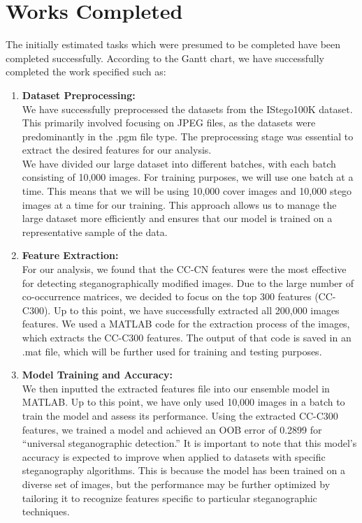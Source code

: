 \chapter{Works Completed}\sloppy

The initially estimated tasks which were presumed to be completed have been completed successfully. According to the Gantt chart, we have successfully completed the work specified such as:

\begin{enumerate}[label=\arabic*.]
    \item \textbf{Dataset Preprocessing:} \\
   We have successfully preprocessed the datasets from the IStego100K dataset\cite{7}. This primarily involved focusing on JPEG files, as the datasets were predominantly in the .pgm file type. The preprocessing stage was essential to extract the desired features for our analysis.\\
   We have divided our large dataset into different batches, with each batch consisting of 10,000 images. For training purposes, we will use one batch at a time. This means that we will be using 10,000 cover images and 10,000 stego images at a time for our training. This approach allows us to manage the large dataset more efficiently and ensures that our model is trained on a representative sample of the data.
    
    \item \textbf{Feature Extraction:} \\
    For our analysis, we found that the CC-CN features were the most effective for detecting steganographically modified images. Due to the large number of co-occurrence matrices, we decided to focus on the top 300 features (CC-C300). Up to this point, we have successfully extracted all 200,000 images features. We used a MATLAB code for the extraction process of the images, which extracts the CC-C300 features. The output of that code is saved in an .mat file, which will be further used for training and testing purposes.

    \item \textbf{Model Training and Accuracy:} \\
    We then inputted the extracted features file into our ensemble model in MATLAB. Up to this point, we have only used 10,000 images in a batch to train the model and assess its performance. Using the extracted CC-C300 features, we trained a model and achieved an OOB error of 0.2899 for ``universal steganographic detection.'' It is important to note that this model's accuracy is expected to improve when applied to datasets with specific steganography algorithms. This is because the model has been trained on a diverse set of images, but the performance may be further optimized by tailoring it to recognize features specific to particular steganographic techniques. 
    

\end{enumerate}
